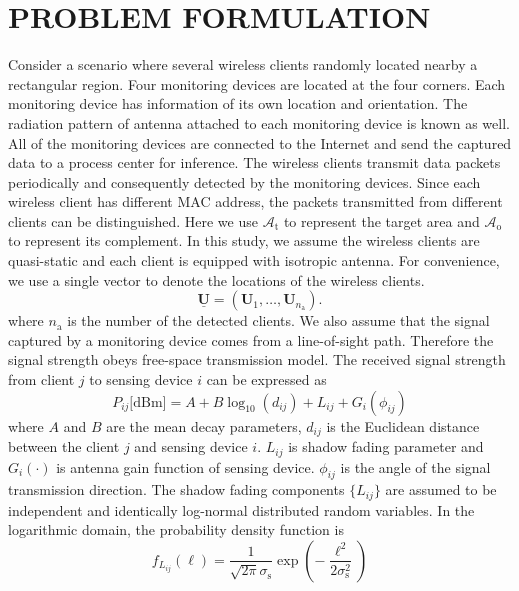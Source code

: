 \chapter{PROBLEM FORMULATION}
Consider a scenario where several wireless clients randomly located nearby a rectangular region. Four monitoring devices are located at the four corners. Each monitoring device has information of its own location and orientation. The radiation pattern of antenna attached to each monitoring device is known as well. All of the monitoring devices are connected to the Internet and send the captured data to a process center for inference. The wireless clients transmit data packets periodically and consequently detected by the monitoring devices. Since each wireless client has different MAC address, the packets transmitted from different clients can be distinguished. Here we use $\mathcal{A}_{\mathrm{t}}$ to represent the target area and $\mathcal{A}_{\mathrm{o}}$ to represent its complement.
In this study, we assume the wireless clients are quasi-static and each client is equipped with isotropic antenna. For convenience, we use a single vector to denote the locations of the wireless clients.
\begin{equation}
\underline{\mathbf{U}} = (\mathbf{U}_1, \ldots, \mathbf{U}_{n_{\mathrm{a}}}).
\end{equation}
where $n_{\mathrm{a}}$ is the number of the detected clients.
We also assume that the signal captured by a monitoring device comes from a line-of-sight path. Therefore the signal strength obeys free-space transmission model. The received signal strength from client $j$ to sensing device $i$ can be expressed as
\begin{equation} 
P_{ij} \text{[dBm]}
= A + B \log_{10}(d_{ij}) + L_{ij} + G_i (\phi_{ij})
\end{equation}
where $A$ and $B$ are the mean decay parameters, $d_{ij}$ is the Euclidean distance between the client $j$ and sensing device $i$. $L_{ij}$ is shadow fading parameter and $G_i (\cdot)$ is antenna gain function of sensing device. $\phi_{ij}$ is the angle of the signal transmission direction.
The shadow fading components $\{ L_{ij} \}$ are assumed to be independent and identically log-normal distributed random variables. In the logarithmic domain, the probability density function is
\begin{equation} 
f_{L_{ij}} (\ell)
= \frac{1}{\sqrt{2 \pi} \sigma_{\mathrm{s}}} 
\exp \left( - \frac{\ell^2}{2 \sigma_{\mathrm{s}}^2} \right)
\end{equation}
